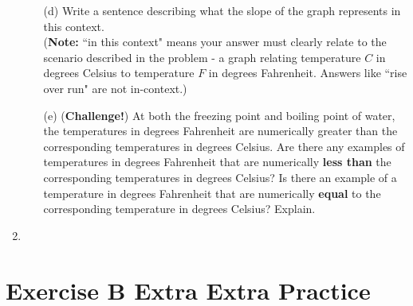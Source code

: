\documentclass[10pt]{article}
\newcounter{example}[section]
\begin{document}
\begin{enumerate}
\begin{itemize}
    \item[(d)] Write a sentence describing what the slope of the graph represents in this context.\\ 
    ({\bf Note:} ``in this context" means your answer must clearly relate to the scenario described in the problem - a graph relating temperature $C$ in degrees Celsius to temperature $F$ in degrees Fahrenheit. Answers like ``rise over run" are not in-context.)

    \item[(e)] ({\bf Challenge!}) At both the freezing point and boiling point of water, the temperatures in degrees Fahrenheit are numerically greater than the corresponding temperatures in degrees Celsius. Are there any examples of temperatures in degrees Fahrenheit that are numerically {\bf less than} the corresponding temperatures in degrees Celsius? Is there an example of a temperature in degrees Fahrenheit that are numerically {\bf equal} to the corresponding temperature in degrees Celsius? Explain.
    
    \end{itemize}

\item 

\end{enumerate}

\section{Exercise B Extra Extra Practice}
\end{document}
